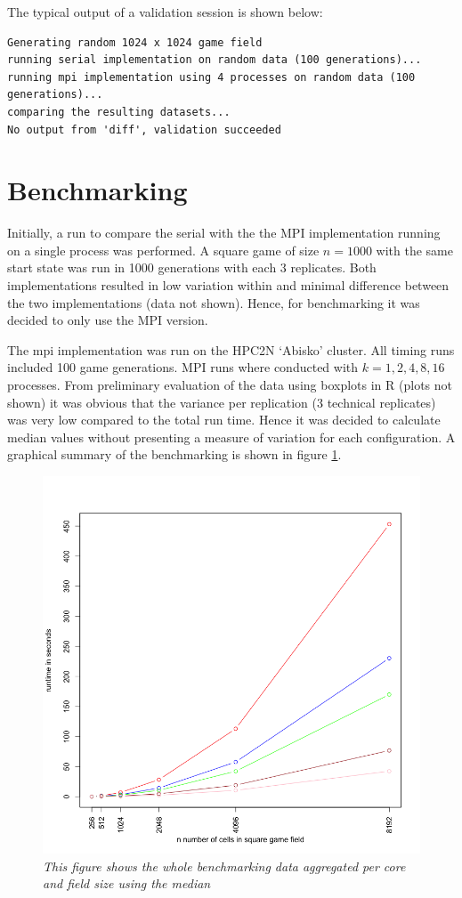 \documentclass[a4paper,11pt,twoside,table,xcdraw]{article}
\begin{document}
The typical output of a validation session is shown below:
\begin{verbatim}
Generating random 1024 x 1024 game field
running serial implementation on random data (100 generations)...
running mpi implementation using 4 processes on random data (100 generations)...
comparing the resulting datasets...
No output from 'diff', validation succeeded
\end{verbatim}

\section{Benchmarking}
Initially, a run to compare the serial with the the MPI implementation running on a single process was performed. A square game of size $n=1000$ with the same start state was run in 1000 generations with each 3 replicates. Both implementations resulted in low variation within and minimal difference between the two implementations (data not shown). Hence, for benchmarking it was decided to only use the MPI version.

The mpi implementation was run on the HPC2N `Abisko' cluster. All timing runs included 100 game generations. MPI runs where conducted with $k={1, 2, 4, 8, 16}$ processes. From preliminary evaluation of the data using boxplots in R \cite{rlanguage} (plots not shown) it was obvious that the variance per replication (3 technical replicates) was very low compared to the total run time. Hence it was decided to calculate median values without presenting a measure of variation for each configuration. A graphical summary of the benchmarking is shown in figure \ref{fig:global}. 

\begin{figure}
  \centering
  \includegraphics[width=1\textwidth]{global.png}
  \caption{\textit{This figure shows the whole benchmarking data aggregated per core and field size using the median}}
  \label{fig:global}
\end{figure}
\end{document}

